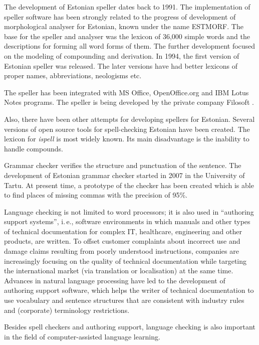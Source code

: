 \begin{multicols}{2}

The development of Estonian speller dates back to 1991. 
The implementation of speller software has been strongly related to the progress of development of morphological analyser for Estonian, known under the name ESTMORF. 
The base for the speller and analyser was the lexicon of 36,000 simple words and the descriptions for forming all word forms of them. 
The further development focused on the modeling of compounding and derivation.
In 1994, the first version of Estonian speller was released. 
The later versions have had better lexicons of proper names, abbreviations, neologisms etc.

The speller has been integrated with MS Office, OpenOffice.org and IBM Lotus Notes programs. The speller is being developed by the private company Filosoft \cite{Filosoft}.

Also, there have been other attempts for developing spellers for Estonian. 
Several versions of open source tools for spell-checking Estonian have been created. 
The lexicon for \textit{ispell} is most widely known. 
Its main disadvantage is the inability to handle compounds. 

Grammar checker verifies the structure and punctuation of the sentence. 
The development of Estonian grammar checker started in 2007 in the University of Tartu. 
At present time, a prototype of the checker has been created which is able to find places of missing commas with the precision of 95\%.

Language checking is not limited to word processors; it is also used
in ``authoring support systems'', i.\,e., software environments in
which manuals and other types of technical documentation for complex
IT, healthcare, engineering and other products, are written. To offset
customer complaints about incorrect use and damage claims resulting
from poorly understood instructions, companies are increasingly
focusing on the quality of technical documentation while targeting the
international market (via translation or localisation) at the same
time. Advances in natural language processing have led to the
development of authoring support software, which helps the writer of
technical documentation to use vocabulary and sentence structures that
are consistent with industry rules and (corporate) terminology
restrictions. 

Besides spell checkers and authoring support, language checking is also important in the field of computer-assisted language learning. 


\end{multicols}
